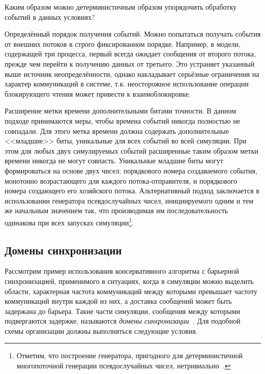 Каким образом можно детерминистичным образом упорядочить обработку событий в данных условиях?

\begin{description*}
    \item[Определённый порядок получения событий.] Можно попытаться получать события от внешних потоков в строго фиксированном порядке. Например, в модели, содержащей три процесса, первый всегда ожидает сообщения от второго потока, прежде чем перейти к получению данных от третьего. Это устраняет указанный выше источник неопределённости, однако накладывает серьёзные ограничения на характер коммуникаций в системе, т.к. неосторожное использование операции блокирующего чтения может привести к взаимоблокировке.
    \item[Расширение метки времени дополнительными битами точности.] В данном подходе принимаются меры, чтобы времена событий никогда полностью не совпадали. Для этого метка времени должна содержать дополнительные <<младшие>> биты, уникальные для всех событий во всей симуляции. При этом для любых двух симулируемых событий расширенные таким образом метки времени никогда не могут совпасть. Уникальные младшие биты могут формироваться на основе двух чисел: порядкового номера создаваемого события, монотонно возрастающего для каждого потока-отправителя, и порядкового номера создающего его хозяйского потока. Альтернативный подход заключается в использовании генератора псевдослучайных чисел, инициируемого одним и тем же начальным значением так, что производимая им последовательность одинакова при всех запусках симуляции\footnote{Отметим, что построение генератора, пригодного для детерминистичной многопоточной генерации псевдослучайных чисел, нетривиально~\cite{dotmix}.}.
\end{description*}


\subsection{Домены синхронизации}

Рассмотрим пример использования консервативного алгоритма с барьерной синхронизацией, применимого в ситуациях, когда в симуляции  можно выделить области, характерная частота коммуникаций между которыми превышает частоту коммуникаций внутри каждой из них, а доставка сообщений может быть задержана до барьера. Такие части симуляции, сообщения между которыми подвергаются задержке, называются \textit{домены синхронизации}~\cite{simics-accelerator-guide}.  Для подобной схемы организации должны выполняться следующие условия.

